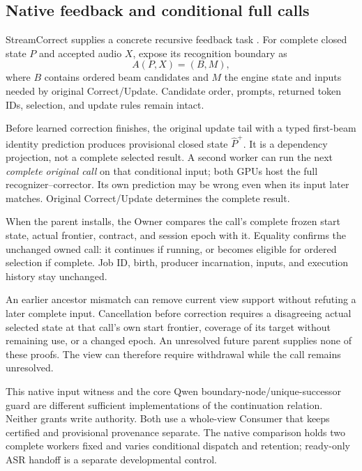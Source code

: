 \subsection{Native feedback and conditional full calls}
\label{subsec:native_full_calls}
StreamCorrect supplies a concrete recursive feedback task
\cite{vu2026streamcorrect}. For complete closed state $P$ and accepted
audio $X$, expose its recognition boundary as
\begin{equation}
 A(P,X)=(B,M),
\end{equation}
where $B$ contains ordered beam candidates and $M$ the engine state and
inputs needed by original Correct/Update. Candidate order,
prompts, returned token IDs, selection, and update rules remain intact.

Before learned correction finishes, the original update tail with a typed
first-beam identity prediction produces provisional closed state
$\widehat P^+$. It is a dependency projection, not a complete selected
result. A second worker can run the next \emph{complete original call} on
that conditional input; both GPUs host the full recognizer--corrector.
Its own prediction may be wrong even when its input later matches.
Original Correct/Update determines the complete result.

When the parent installs, the Owner compares the call's complete frozen
start state, actual frontier, contract, and session epoch with it. Equality
confirms the unchanged owned call: it continues if running, or becomes
eligible for ordered selection if complete. Job ID, birth, producer
incarnation, inputs, and execution history stay unchanged.

An earlier ancestor mismatch can remove current view support without
refuting a later complete input. Cancellation before correction requires
a disagreeing actual selected state at that call's own start frontier,
coverage of its target without remaining use, or a changed epoch. An
unresolved future parent supplies none of these proofs. The view can
therefore require withdrawal while the call remains unresolved.

This native input witness and the core Qwen boundary-node/unique-successor
guard are different sufficient implementations of the continuation
relation. Neither grants write authority. Both use a whole-view Consumer
that keeps certified and provisional provenance separate. The native
comparison holds two complete workers fixed and varies conditional
dispatch and retention; ready-only ASR handoff is a separate developmental
control.

